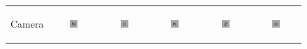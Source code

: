 
\begin{figure}[!t]
	\centering

	\begin{tabular}{@{}r@{ } c@{ } c@{ } c@{ } c@{ } c }

	\begin{sideways} \parbox[b]{20mm} {Camera} \end{sideways} &
	\includegraphics[width=0.185\textwidth]{__Images/05/WB_20-200_-2@180/wb_N_20-200_Camera-2,00D@180(lens).png} &
	\includegraphics[width=0.185\textwidth]{__Images/05/WB_20-200_-2@180/wb_C_20-200_Camera-2,00D@180(lens).png} &
	\includegraphics[width=0.185\textwidth]{__Images/05/WB_20-200_-2@180/wb_K_20-200_Camera-2,00D@180(lens).png} &
	\includegraphics[width=0.185\textwidth]{__Images/05/WB_20-200_-2@180/wb_Z_20-200_Camera-2,00D@180(lens).png} &
	\includegraphics[width=0.185\textwidth]{__Images/05/WB_20-200_-2@180/wb_O_20-200_Camera-2,00D@180(lens).png} \\


\end{tabular}
\end{figure}
